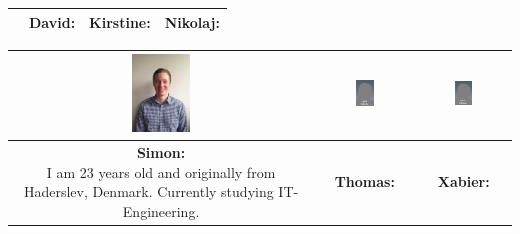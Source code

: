 \begin{table}[h]
\begin{tabular}{|c|c|c|c|}
&

\parbox[t] {0.2\textwidth}{
\textbf{David:} \\

} 

&

\parbox[t] {0.2\textwidth}{
\textbf{Kirstine:} \\

} 

&

\parbox[t] {0.2\textwidth}{
\textbf{Nikolaj:} \\

} 

\\\hline
\end{tabular}

\begin{tabular}{|c|c|c|}
\hline
\includegraphics[width=0.2\textwidth]{graphics/Simon_profile} & %
\includegraphics[width=0.2\textwidth]{graphics/AnonProfile} & %
\includegraphics[width=0.2\textwidth]{graphics/AnonProfile} \\ \hline %
\parbox[t] {0.2\textwidth}{
\textbf{Simon:} \\
I am 23 years old and originally from Haderslev, Denmark. Currently studying IT-Engineering.

} 

&

\parbox[t] {0.2\textwidth}{
\textbf{Thomas:} \\

} 

&

\parbox[t] {0.2\textwidth}{
\textbf{Xabier:} \\

} 

\\\hline
\end{tabular}
\end{table}



